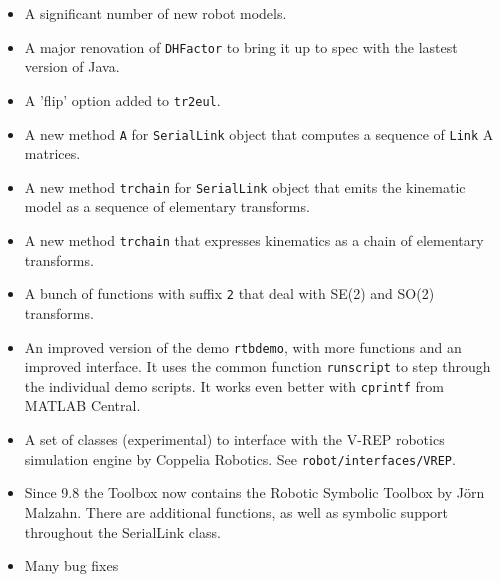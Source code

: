 \documentclass[a4paper]{report}
\begin{document}
\begin{itemize}
\item A significant number of new robot models.
\item A major renovation of \texttt{DHFactor} to bring it up to spec with the lastest version of Java.
\item A 'flip' option added to \texttt{tr2eul}.
\item A new method \texttt{A} for \texttt{SerialLink} object that computes a sequence of \texttt{Link} A matrices.
\item A new method \texttt{trchain} for \texttt{SerialLink} object that emits the kinematic model as a sequence of elementary
transforms.
\item A new method \texttt{trchain} that expresses kinematics as a chain of elementary transforms.
\item A bunch of functions with suffix \texttt{2} that deal with SE(2) and SO(2) transforms.
\item An improved version of the demo \texttt{rtbdemo}, with more functions and an improved interface.  It uses the common
function \texttt{runscript} to step through the individual demo scripts.  It works even better with \texttt{cprintf} from MATLAB Central.
\item A set of classes (experimental) to interface with the V-REP robotics simulation engine by Coppelia Robotics.  See
\texttt{robot/interfaces/VREP}.
\item Since 9.8 the Toolbox now contains the Robotic Symbolic Toolbox
by J\"{o}rn Malzahn.  There are additional functions, as well as symbolic
support throughout the SerialLink class.
\item Many bug fixes
\end{itemize}
\end{document}
